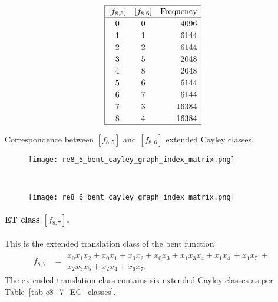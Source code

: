 \documentclass[12pt,a4paper]{article}
\begin{document}
\begin{table}[!bhpt] %
%
\small{}
\begin{align*}
\def\arraystretch{1.2}
\begin{array}{|ccr|}
\hline
[f_{8,5}] &
[f_{8,6}] &
\text{Frequency}
\\
\hline
  0 &    0 &  4096
\\
  1 &    1 &  6144
\\
  2 &    2 &  6144
\\
  3 &    5 &  2048
\\
  4 &    8 &  2048
\\
  5 &    6 &  6144
\\
  6 &    7 &  6144
\\
  7 &    3 & 16384
\\
  8 &    4 & 16384
\\
\hline
\end{array}
\end{align*}
\caption{Correspondence between $[f_{8,5}]$ and $[f_{8,6}]$ extended Cayley classes.}
\label{tab-c8_5-c8_6_EC_classes}
\end{table}

\begin{figure}[!bhpt] %
\centering
\begin{minipage}{.48\textwidth}
  \centering
  \texttt{[image: re8\_5\_bent\_cayley\_graph\_index\_matrix.png]}
  \label{fig:re8_5_bent_cayley_graph_index_matrix}
\end{minipage}
~~
\begin{minipage}{.48\textwidth}
  \centering
  \texttt{[image: re8\_6\_bent\_cayley\_graph\_index\_matrix.png]}
  \label{fig:re8_6_bent_cayley_graph_index_matrix}
\end{minipage}
\end{figure}

\paragraph*{ET class $[f_{8,7}]$.}
%
This is the extended translation class of the bent function
\small{}
\begin{align*}
f_{ 8 , 7 } &=
\begin{array}{l}
x_{0} x_{1} x_{2} + x_{0} x_{1} + x_{0} x_{2} + x_{0} x_{3} + x_{1} x_{3} x_{4} + x_{1} x_{4}\, +
x_{1} x_{5}\, +
\\
x_{2} x_{3} x_{5} + x_{2} x_{4} + x_{6} x_{7}.
\end{array}
\end{align*}
\normalsize{}
The extended translation class contains six extended Cayley classes as per Table~\ref{tab-c8_7_EC_classes}.
\end{document}
